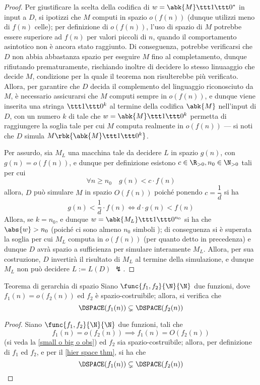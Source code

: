 \documentclass[a4paper, 12pt]{report}
\begin{document}
\begin{proof}
        Per giustificare la scelta della codifica di $w = \abk{M} \ttt 1 \ttt 0 ^*$ in input a $D$, si ipotizzi che $M$ computi in spazio $o(f(n))$ (dunque utilizzi meno di $f(n)$ celle); per definizione di $o(f(n))$, l'uso di spazio di $M$ potrebbe essere superiore ad $f(n)$ per valori piccoli di $n$, quando il comportamento asintotico non è ancora stato raggiunto. Di conseguenza, potrebbe verificarsi che $D$ non abbia abbastanza spazio per eseguire $M$ fino al completamento, dunque rifiutando prematuramente, rischiando inoltre di decidere lo stesso linuaaggio che decide $M$, condizione per la quale il teorema non risulterebbe più verificato. Allora, per garantire che $D$ decida il complemento del linguaggio riconosciuto da $M$, è necessario assicurarsi che $M$ computi sempre in $o(f(n))$, e dunque viene inserita una stringa $\ttt 1 \ttt 0^k$ al termine della codifica $\abk{M}$ nell'input di $D$, con un numero $k$ di  tale che $w = \abk{M} \ttt 1 \ttt 0 ^k$ permetta di raggiungere la soglia tale per cui $M$ computa realmente in $o(f(n))$ --- si noti che $D$ simula $M\rbk{\abk{M} \ttt 1 \ttt 0^k}$.

        Per assurdo, sia $M_L$ una macchina tale da decidere $L$ in spazio $g(n)$, con $g(n) = o(f(n))$, e dunque per definizione esistono $c \in \R_{>0}, n_0 \in \N_{> 0}$ tali per cui $$\forall n \ge n_0 \quad g(n) < c \cdot f(n)$$ allora, $D$ può simulare $M$ in spazio $O(f(n))$ poiché ponendo $c = \dfrac{1}{d}$ si ha $$g(n) < \dfrac{1}{d} \cdot f(n) \iff d \cdot g(n) < f(n)$$ Allora, se $k = n_0$, e dunque $w = \abk{M_L}\ttt 1 \ttt 0^{n_0}$ si ha che $\abs{w} > n_0$ (poiché ci sono almeno $n_0$ simboli ); di conseguenza si è superata la soglia per cui $M_L$ computa in $o(f(n))$ (per quanto detto in precedenza) e dunque $D$ avrà spazio a sufficienza per simulare interamente $M_L$. Allora, per sua costruzione, $D$ invertirà il risultato di $M_L$ al termine della simulazione, e dunque $M_L$ non può decidere $L := L(D)$ $\lightning$.
    \end{proof}

    \begin{framedcor}[label={hier space thm cor}]{Teorema di gerarchia di spazio}
        Siano $\func{f_1, f_2}{\N}{\N}$ due funzioni, dove $f_1(n) = o(f_2(n))$ ed $f_2$ è spazio-costruibile; allora, si verifica che $$\DSPACE(f_1(n)) \subsetneq \DSPACE(f_2(n))$$
    \end{framedcor}

    \begin{proof}
        Siano $\func{f_1, f_2}{\N}{\N}$ due funzioni, tali che $$f_1(n) = o(f_2(n)) \implies f_1(n) = O(f_2(n))$$ (si veda la \cref{small o big o obs}) ed $f_2$ sia spazio-costruibile; allora, per definizione di $f_1$ ed $f_2$, e per il \cref{hier space thm}, si ha che $$\DSPACE(f_1(n)) \subsetneq \DSPACE(f_2(n))$$
    \end{proof}
\end{document}
